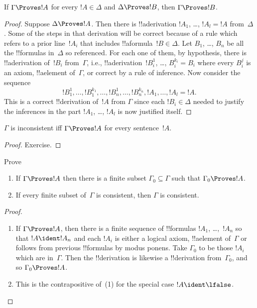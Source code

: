 \documentclass[../../include/open-logic-section]{subfiles}
\begin{document}
\begin{prop}[Transitivity]
If $\Gamma \Proves !A$ for every $!A \in \Delta$ and $\Delta \Proves
!B$, then $\Gamma \Proves !B$.
\end{prop}

\begin{proof}
  Suppose $\Delta \Proves !A$. Then there is !!a{derivation} $!A_1$, \dots, $!A_l = !A$
  from~$\Delta$. Some of the steps in that derivation will be correct
  because of a rule which refers to a prior line~$!A_i$ that includes
  !!a{formula}~$!B \in \Delta$. Let $B_1$, \dots, $B_n$ be all the
  !!{formula}s in~$\Delta$ so referenced. For each one of them, by
  hypothesis, there is !!a{derivation} of~$!B_i$ from~$\Gamma$, i.e.,
  !!a{derivation}~$!B_i^1$, \dots, $B_i^{k_i} = B_i$ where every $B_i^j$
  is an axiom, !!a{element} of~$\Gamma$, or correct by a rule of
  inference. Now consider the sequence
  \[
  !B_1^1, \dots, !B_1^{k_1}, \dots, !B_n^1, \dots, !B_n^{k_n}, !A_1, \dots, !A_l = !A.
  \]
  This is a correct !!{derivation} of~$!A$ from $\Gamma$ since each
  $!B_i \in \Delta$ needed to justify the inferences in the part
  $!A_1$, \dots, $!A_l$ is now justified itself.
\end{proof}
  
\begin{prop}
$\Gamma$ is inconsistent iff $\Gamma \Proves !A$ for every
  sentence~$!A$.
\end{prop}

\begin{proof}
Exercise.
\end{proof}

\begin{prob}
Prove 
\end{prob}

\begin{prop}[Compactness]
  \begin{enumerate}
  \item If $\Gamma \Proves !A$ then there is a finite subset $\Gamma_0
    \subseteq \Gamma$ such that $\Gamma_0 \Proves !A$.
  \item If every finite subset of~$\Gamma$ is
    consistent, then $\Gamma$ is consistent.
  \end{enumerate}
\end{prop}

\begin{proof}
  \begin{enumerate}
    \item If $\Gamma \Proves !A$, then there is a finite sequence of
      !!{formula}s $!A_1$, \dots,~$!A_n$ so that $!A \ident !A_n$ and
      each $!A_i$ is either a logical axiom, !!a{element} of~$\Gamma$
      or follows from previous !!{formula}s by modus ponens.  Take
      $\Gamma_0$ to be those $!A_i$ which are in~$\Gamma$.  Then the
      !!{derivation} is likewise a !!{derivation} from~$\Gamma_0$, and
      so $\Gamma_0 \Proves !A$.
    \item This is the contrapositive of~(1) for the special case $!A
      \ident \lfalse$.
\end{enumerate}
\end{proof}
\end{document}

